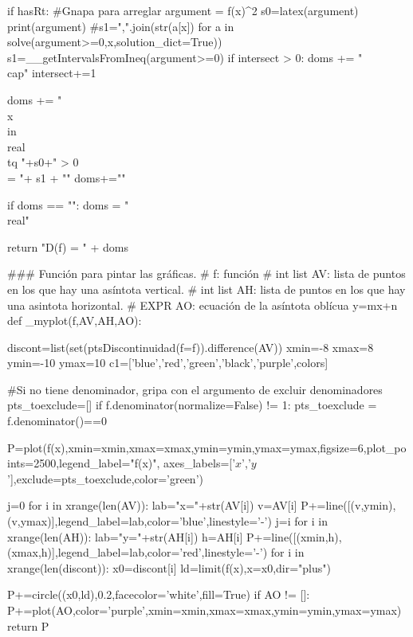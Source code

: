 \begin{sagesilent}
        
    if hasRt:
        #Gnapa para arreglar
        argument = f(x)^2
        s0=latex(argument)
        print(argument)
        #s1=",".join(str(a[x]) for a in solve(argument>=0,x,solution_dict=True))
        s1=__getIntervalsFromIneq(argument>=0)
        if intersect > 0:
            doms += "\\cap"
        intersect+=1

        doms += "\\{x\\in\\real \\tq "+s0+" > 0 \\} = "+ s1 + "\n"
        doms+=""  
              
    if doms == "":
        doms = "\\real"
        
    return "D(f) = " + doms

### Función para pintar las gráficas.
# f: función
# int list AV: lista de puntos en los que hay una asíntota vertical.
# int list AH: lista de puntos en los que hay una asintota horizontal.
# EXPR AO: ecuación de la asíntota oblícua y=mx+n
def _myplot(f,AV,AH,AO):
 
 discont=list(set(ptsDiscontinuidad(f=f)).difference(AV))
 xmin=-8
 xmax=8
 ymin=-10
 ymax=10
 c1=['blue','red','green','black','purple',colors]

 
 #Si no tiene denominador, gripa con el argumento de excluir denominadores
 pts_toexclude=[]
 if f.denominator(normalize=False) != 1:
    pts_toexclude = f.denominator()==0
 
 P=plot(f(x),xmin=xmin,xmax=xmax,ymin=ymin,ymax=ymax,figsize=6,plot_points=2500,legend_label="f(x)", axes_labels=['$x$','$y$'],exclude=pts_toexclude,color='green')
 
 j=0
 for i in xrange(len(AV)):
  lab="x="+str(AV[i])
  v=AV[i]
  P+=line([(v,ymin),(v,ymax)],legend_label=lab,color='blue',linestyle='-')
  j=i
 for i in xrange(len(AH)):
  lab="y="+str(AH[i])
  h=AH[i]
  P+=line([(xmin,h),(xmax,h)],legend_label=lab,color='red',linestyle='-')
 for i in xrange(len(discont)):
  x0=discont[i]
  ld=limit(f(x),x=x0,dir="plus")
  
  P+=circle((x0,ld),0.2,facecolor='white',fill=True)
 if AO != []:
  P+=plot(AO,color='purple',xmin=xmin,xmax=xmax,ymin=ymin,ymax=ymax)
 return P
\end{sagesilent}


